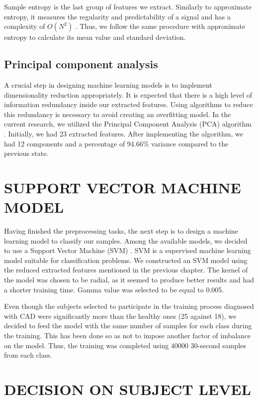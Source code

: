 Sample entropy is the last group of features we extract. Similarly to approximate entropy, it measures the regularity and predictability of a signal and has a complexity of $O(N^2)$ \cite{sampEn_article}. Thus, we follow the same procedure with approximate entropy to calculate its mean value and standard deviation.

\subsection{Principal component analysis}
\label{ssec:pca}

A crucial step in designing machine learning models is to implement dimensionality reduction appropriately. It is expected that there is a high level of information redundancy inside our extracted features. Using algorithms to reduce this redundancy is necessary to avoid creating an overfitting model. In the current research, we utilized the Principal Component Analysis (PCA) algorithm \cite{pca_article}. Initially, we had 23 extracted features. After implementing the algorithm, we had 12 components and a percentage of 94.66\% variance compared to the previous state.

\section{SUPPORT VECTOR MACHINE MODEL}
\label{sec:svm}

Having finished the preprocessing tasks, the next step is to design a machine learning model to classify our samples. Among the available models, we decided to use a Support Vector Machine (SVM) \cite{svm_article}. SVM is a supervised machine learning model suitable for classification problems. We constructed an SVM model using the reduced extracted features mentioned in the previous chapter. The kernel of the model was chosen to be radial, as it seemed to produce better results and had a shorter training time. Gamma value was selected to be equal to 0.005. 

Even though the subjects selected to participate in the training process diagnosed with CAD were significantly more than the healthy ones (25 against 18), we decided to feed the model with the same number of samples for each class during the training. This has been done so as not to impose another factor of imbalance on the model. Thus, the training was completed using 40000 30-second samples from each class.

\section{DECISION ON SUBJECT LEVEL}
\label{sec:subject_evaluation}

